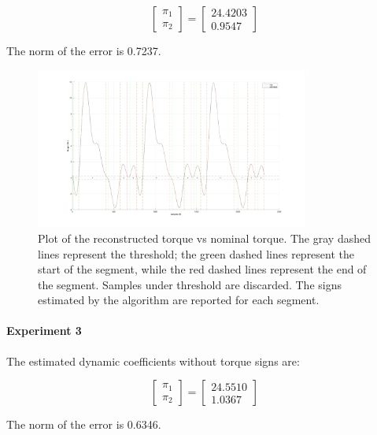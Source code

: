 \documentclass{article}
\begin{document}
\[\begin{bmatrix}
\pi_1  \\ \pi_2 
\end{bmatrix}=\begin{bmatrix}
24.4203 \\ 0.9547
\end{bmatrix}\]

The norm of the error is 0.7237.

\begin{figure}[!htbp]
\centering
\includegraphics[width=0.8\textwidth]{images/1-dof/results_experiment2.png}
\caption{Plot of the reconstructed torque vs nominal torque. The gray dashed lines represent the threshold; the green dashed lines represent the start of the segment, while the red dashed lines represent the end of the segment. Samples under threshold are discarded. The signs estimated by the algorithm are reported for each segment.}
\end{figure}
\FloatBarrier

\paragraph{Experiment 3} The estimated dynamic coefficients without torque signs are:

\[\begin{bmatrix}
\pi_1  \\ \pi_2 
\end{bmatrix}=\begin{bmatrix}
24.5510 \\ 1.0367
\end{bmatrix}\]

The norm of the error is 0.6346.
\end{document}

